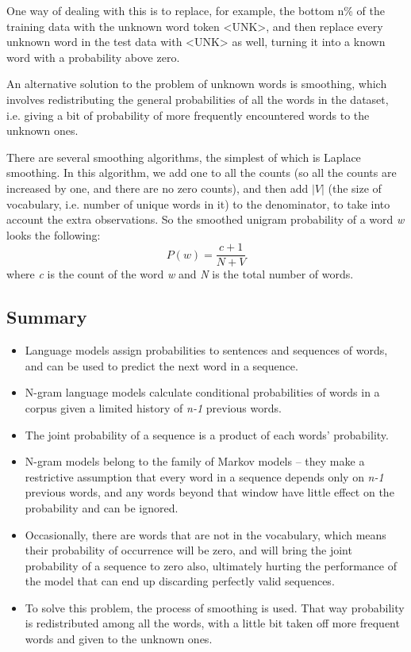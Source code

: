 \documentclass[sigplan,screen]{acmart}
\begin{document}
One way of dealing with this is to replace, for example, the bottom n\% of the training data with the unknown word token <UNK>, and then replace every unknown word in the test data with <UNK> as well, turning it into a known word with a probability above zero.

An alternative solution to the problem of unknown words is smoothing, which involves redistributing the general probabilities of all the words in the dataset, i.e. giving a bit of probability of more frequently encountered words to the unknown ones.

There are several smoothing algorithms, the simplest of which is Laplace smoothing. In this algorithm, we add one to all the counts (so all the counts are increased by one, and there are no zero counts), and then add $|V|$ (the size of vocabulary, i.e. number of unique words in it) to the denominator, to take into account the extra observations. So the smoothed unigram probability of a word \textit{w} looks the following:
\begin{equation}
    P(w)=\frac{c+1}{N+V}
\end{equation}
where \textit{c} is the count of the word \textit{w} and \textit{N} is the total number of words.

\subsection{Summary}
\begin{itemize}
    \item Language models assign probabilities to sentences and sequences of words, and can be used to predict the next word in a sequence.
    \item N-gram language models calculate conditional probabilities of words in a corpus given a limited history of \textit{n-1} previous words.
    \item The joint probability of a sequence is a product of each words' probability.
    \item N-gram models belong to the family of Markov models -- they make a restrictive assumption that every word in a sequence depends only on \textit{n-1} previous words, and any words beyond that window have little effect on the probability and can be ignored.
    \item Occasionally, there are words that are not in the vocabulary, which means their probability of occurrence will be zero, and will bring the joint probability of a sequence to zero also, ultimately hurting the performance of the model that can end up discarding perfectly valid sequences.
    \item To solve this problem, the process of smoothing is used. That way probability is redistributed among all the words, with a little bit taken off more frequent words and given to the unknown ones.
\end{itemize}
\end{document}
